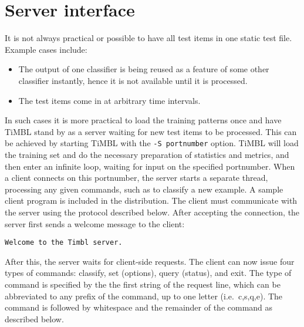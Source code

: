 \documentclass{report}
\begin{document}
\section{Server interface}
\label{serverformat}

It is not always practical or possible to have all test items in one static test file. Example cases include:

\begin{itemize}

\item The output of one classifier is being reused as a feature of some other classifier instantly, hence it is not available until it is processed.

\item The test items come in at arbitrary time intervals.

\end{itemize}

In such cases it is more practical to load the training patterns once and have TiMBL stand by as a server waiting for new test items to be processed. This can be achieved by starting TiMBL with the {\tt -S portnumber} option. TiMBL will load the training set and do the necessary preparation of statistics and metrics, and then enter an infinite loop, waiting for input on the specified portnumber. When a client connects on this portnumber, the server starts a separate thread, processing any given commands, such as to classify a new example. A sample client program is included in the distribution. The client must communicate with the server using the protocol described below. After accepting the connection, the server first sends a welcome message to the client:

{\tt Welcome to the Timbl server.}

After this, the server waits for client-side requests.  The client can now issue four types of commands: classify, set (options), query (status), and exit. The type of command is specified by the the first string of the request line, which can be abbreviated to any prefix of the command, up to one letter (i.e.~c,s,q,e). The command is followed by whitespace and the remainder of the command as described below.
\end{document}
